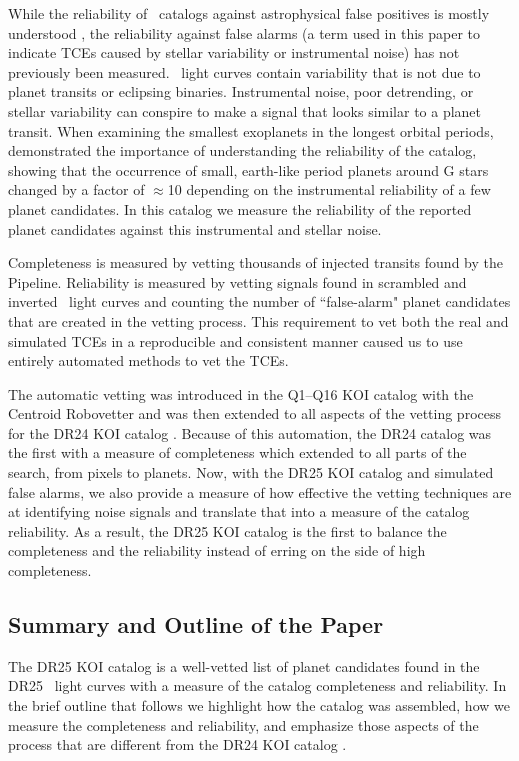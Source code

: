 While the reliability of \Kepler\ catalogs against astrophysical false positives is mostly understood \citep[see e.g.][]{Morton2016}, the reliability against false alarms (a term used in this paper to indicate TCEs caused by stellar variability or instrumental noise) has not previously been measured.  \Kepler\ light curves contain variability that is not due to planet transits or eclipsing binaries.  Instrumental noise, poor detrending, or stellar variability can conspire to make a signal that looks similar to a planet transit. When examining the smallest exoplanets in the longest orbital periods, \citet{Burke2015} demonstrated the importance of understanding the reliability of the catalog, showing that the occurrence of small, earth-like period planets around G stars changed by a factor of $\approx$10 depending on the instrumental reliability of a few planet candidates.  In this catalog we measure the reliability of the reported planet candidates against this instrumental and stellar noise.  

Completeness is measured by vetting thousands of injected transits found by the \Kepler Pipeline. Reliability is measured by vetting signals found in scrambled and inverted \Kepler\ light curves and counting the number of ``false-alarm" planet candidates that are created in the vetting process. This requirement to vet both the real and simulated TCEs in a reproducible and consistent manner caused us to use entirely automated methods to vet the TCEs.  

The automatic vetting was introduced in the Q1--Q16 KOI catalog \citep{Mullally2015cat} with the Centroid Robovetter and was then extended to all aspects of the vetting process for the DR24 KOI catalog \citep{Coughlin2016}. Because of this automation, the DR24 catalog was the first with a measure of completeness which extended to all parts of the search, from pixels to planets.  Now, with the DR25 KOI catalog and simulated false alarms, we also provide a measure of how effective the vetting techniques are at identifying noise signals and translate that into a measure of the catalog reliability. As a result, the DR25 KOI catalog is the first to balance the completeness and the reliability instead of erring on the side of high completeness. 

\subsection{Summary and Outline of the Paper}

The DR25 KOI catalog is a well-vetted list of planet candidates found in the DR25 \Kepler\ light curves with a measure of the catalog completeness and reliability. In the brief outline that follows we highlight how the catalog was assembled, how we measure the completeness and reliability, and emphasize those aspects of the process that are different from the DR24 KOI catalog \citep{Coughlin2016}.


